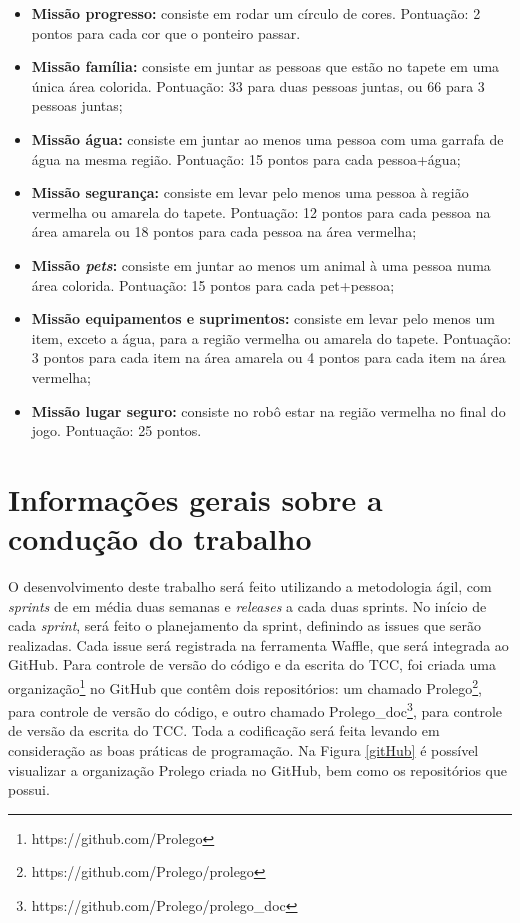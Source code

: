 \begin{itemize}
\item \textbf{Missão progresso:} consiste em rodar um círculo de cores. Pontuação: 2 pontos para cada cor que o ponteiro passar.
\item \textbf{Missão família:} consiste em juntar as pessoas que estão no tapete em uma única área colorida. Pontuação: 33 para duas pessoas juntas, ou 66 para 3 pessoas juntas;
\item \textbf{Missão água:} consiste em juntar ao menos uma pessoa com uma garrafa de água na mesma região. Pontuação: 15 pontos para cada pessoa+água;
\item \textbf{Missão segurança:} consiste em levar pelo menos uma pessoa à região vermelha ou amarela do tapete. Pontuação: 12 pontos para cada pessoa na área amarela ou 18 pontos para cada pessoa na área vermelha;
\item \textbf{Missão \textit{pets}:} consiste em juntar ao menos um animal à uma pessoa numa área colorida. Pontuação: 15 pontos para cada pet+pessoa;
\item \textbf{Missão equipamentos e suprimentos:} consiste em levar pelo menos um item, exceto a água, para a região vermelha ou amarela do tapete. Pontuação: 3 pontos para cada item na área amarela ou 4 pontos para cada item na área vermelha;
\item \textbf{Missão lugar seguro:} consiste no robô estar na região vermelha no final do jogo. Pontuação: 25 pontos. 
\end{itemize}

\section{Informações gerais sobre a condução do trabalho}
O desenvolvimento deste trabalho será feito utilizando a metodologia ágil, com \textit{sprints} de em média duas semanas e \textit{releases} a cada duas sprints. No início de cada \textit{sprint}, será feito o planejamento da sprint, definindo as issues que serão realizadas. Cada issue será registrada na ferramenta Waffle, que será integrada ao GitHub.
Para controle de versão do código e da escrita do TCC, foi criada uma organização\footnote{https://github.com/Prolego} no GitHub que contêm dois repositórios: um chamado Prolego\footnote{https://github.com/Prolego/prolego}, para controle de versão do código, e outro chamado Prolego\_doc\footnote{https://github.com/Prolego/prolego\_doc}, para controle de versão da escrita do TCC. Toda a codificação será feita levando em consideração as boas práticas de programação. Na Figura \ref{gitHub} é possível visualizar a organização Prolego criada no GitHub, bem como os repositórios que possui.

